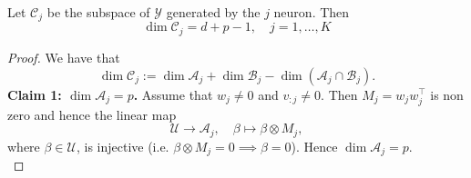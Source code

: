 \begin{proposition}
    Let $\mathcal{C}_{j}$ be the subspace of $\mathcal{Y}$ generated by the $j$ neuron.
    Then
    \begin{equation}
        \dim \mathcal{C}_{j} = d +p-1, \quad j=1,\dots,K
    \end{equation}
\end{proposition}

\begin{proof}
    We have that
    \begin{equation*}
    \dim \mathcal{C}_{j} := \dim \mathcal{A}_{j} + \dim \mathcal{B}_{j} - \dim (\mathcal{A}_{j} \cap \mathcal{B}_{j}).
    \end{equation*}
    \textbf{Claim 1: $\dim \mathcal{A}_{j} = p$.}
    Assume that $w_{j} \not = 0$ and $v_{:j}\not = 0$.
    Then $M_{j}=w_{j} w_{j}^{\top}$ is non zero and hence the linear map
    \begin{equation}
        \mathcal{U} \to \mathcal{A}_{j}, \quad \beta \mapsto \beta \otimes M_{j},
    \end{equation}
    where $\beta \in \mathcal{U}$, is injective (i.e. $\beta \otimes M_{j} =0 \implies \beta =0 $).
    Hence $\dim \mathcal{A}_{j} = p$.
    \\
    

\end{proof}
